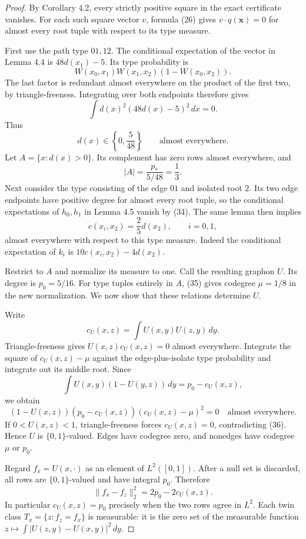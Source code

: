 \begin{proof}
By Corollary 4.2, every strictly positive square in the exact certificate
vanishes. For each such square vector $v$, formula (26) gives
$v\cdot q(\mathbf x)=0$ for almost every root tuple with respect to its
type measure.

First use the path type $01,12$. The conditional expectation of the vector
in Lemma 4.4 is $48d(x_1)-5$. Its type probability is
\[
 W(x_0,x_1)W(x_1,x_2)(1-W(x_0,x_2)).
\]
The last factor is redundant almost everywhere on the product of the first
two, by triangle-freeness. Integrating over both endpoints therefore gives
\[
 \int d(x)^2(48d(x)-5)^2\,dx=0.
\]
Thus
\begin{equation}\tag{34}\label{eq:34}
 d(x)\in\left\{0,\frac5{48}\right\}\qquad\text{almost everywhere}.
\end{equation}
Let $A=\{x:d(x)>0\}$. Its complement has zero rows almost everywhere, and
\[
 |A|=\frac{p_\ast}{5/48}=\frac13.
\]
Next consider the type consisting of the edge $01$ and isolated root $2$.
Its two edge endpoints have positive degree for almost every root tuple,
so the conditional expectations of $h_0,h_1$ in Lemma 4.5 vanish by (34).
The same lemma then implies
\begin{equation}\tag{35}\label{eq:35}
 c(x_i,x_2)=\frac25d(x_2),\qquad i=0,1,
\end{equation}
almost everywhere with respect to this type measure. Indeed the conditional
expectation of $k_i$ is $10c(x_i,x_2)-4d(x_2)$.

Restrict to $A$ and normalize its measure to one. Call the resulting
graphon $U$. Its degree is $p_0=5/16$. For type tuples entirely in $A$,
(35) gives codegree $\mu=1/8$ in the new normalization. We now show that
these relations determine $U$.

Write
\[
 c_U(x,z)=\int U(x,y)U(z,y)\,dy.
\]
Triangle-freeness gives $U(x,z)c_U(x,z)=0$ almost everywhere. Integrate
the square of $c_U(x,z)-\mu$ against the edge-plus-isolate type probability
and integrate out its middle root. Since
\[
 \int U(x,y)(1-U(y,z))\,dy=p_0-c_U(x,z),
\]
we obtain
\begin{equation}\tag{36}\label{eq:36}
 (1-U(x,z))(p_0-c_U(x,z))(c_U(x,z)-\mu)^2=0
 \quad\text{almost everywhere}.
\end{equation}
If $0<U(x,z)<1$, triangle-freeness forces $c_U(x,z)=0$, contradicting
(36). Hence $U$ is $\{0,1\}$-valued. Edges have codegree zero, and
nonedges have codegree $\mu$ or $p_0$.

Regard $f_x=U(x,\cdot)$ as an element of $L^2([0,1])$. After a null set
is discarded, all rows are $\{0,1\}$-valued and have integral $p_0$.
Therefore
\[
 \|f_x-f_z\|_2^2=2p_0-2c_U(x,z).
\]
In particular $c_U(x,z)=p_0$ precisely when the two rows agree in $L^2$.
Each twin class $T_x=\{z:f_z=f_x\}$ is measurable: it is the zero set of
the measurable function $z\mapsto\int|U(z,y)-U(x,y)|^2\,dy$.


\end{proof}
